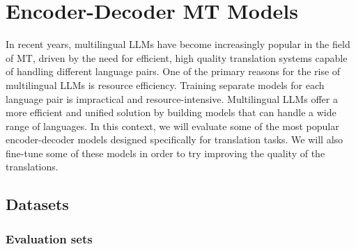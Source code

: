 \documentclass[11pt,english,listoffigures,listoftables]{tfgetsinf}
\begin{document}






\chapter{Encoder-Decoder MT Models}
\label{chapter3}

In recent years, multilingual LLMs have become increasingly popular in the field of MT, driven by the need for efficient, high quality translation systems capable of handling different language pairs. One of the primary reasons for the rise of multilingual LLMs is resource efficiency. Training separate models for each language pair is impractical and resource-intensive. Multilingual LLMs offer a more efficient and unified solution by building models that can handle a wide range of languages. In this context, we will evaluate some of the most popular encoder-decoder models designed specifically for translation tasks. We will also fine-tune some of these models in order to try improving the quality of the translations.


\section{Datasets}

\subsection{Evaluation sets}
\label{sec:eval_datasets}
\end{document}
